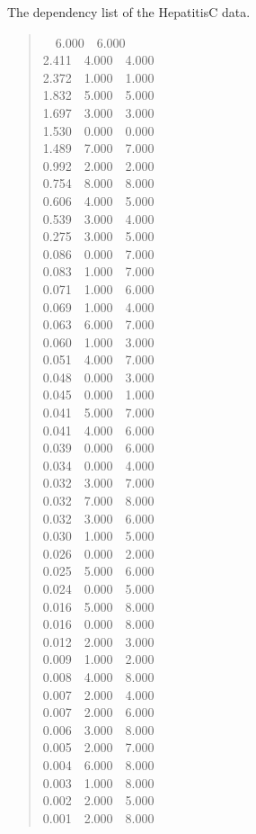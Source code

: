\documentclass[a4paper]{article}
\begin{document}
The dependency list of the HepatitisC data.
%
\begin{quote}{\ttfamily \raggedright {}~~6.000~~6.000\\
2.411~~4.000~~4.000\\
2.372~~1.000~~1.000\\
1.832~~5.000~~5.000\\
1.697~~3.000~~3.000\\
1.530~~0.000~~0.000\\
1.489~~7.000~~7.000\\
0.992~~2.000~~2.000\\
0.754~~8.000~~8.000\\
0.606~~4.000~~5.000\\
0.539~~3.000~~4.000\\
0.275~~3.000~~5.000\\
0.086~~0.000~~7.000\\
0.083~~1.000~~7.000\\
0.071~~1.000~~6.000\\
0.069~~1.000~~4.000\\
0.063~~6.000~~7.000\\
0.060~~1.000~~3.000\\
0.051~~4.000~~7.000\\
0.048~~0.000~~3.000\\
0.045~~0.000~~1.000\\
0.041~~5.000~~7.000\\
0.041~~4.000~~6.000\\
0.039~~0.000~~6.000\\
0.034~~0.000~~4.000\\
0.032~~3.000~~7.000\\
0.032~~7.000~~8.000\\
0.032~~3.000~~6.000\\
0.030~~1.000~~5.000\\
0.026~~0.000~~2.000\\
0.025~~5.000~~6.000\\
0.024~~0.000~~5.000\\
0.016~~5.000~~8.000\\
0.016~~0.000~~8.000\\
0.012~~2.000~~3.000\\
0.009~~1.000~~2.000\\
0.008~~4.000~~8.000\\
0.007~~2.000~~4.000\\
0.007~~2.000~~6.000\\
0.006~~3.000~~8.000\\
0.005~~2.000~~7.000\\
0.004~~6.000~~8.000\\
0.003~~1.000~~8.000\\
0.002~~2.000~~5.000\\
0.001~~2.000~~8.000
}
\end{quote}
\end{document}
